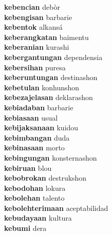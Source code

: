 \textbf{kebencian } debòr \\
\textbf{kebengisan } barbarie \\
\textbf{kebentok } alkansá \\
\textbf{keberangkatan } baimentu \\
\textbf{keberanian } kurashi \\
\textbf{kebergantungan } dependensia \\
\textbf{kebersihan } puresa \\
\textbf{keberuntungan } destinashon \\
\textbf{kebetulan } konhunshon \\
\textbf{kebezajelasan } deklarashon \\
\textbf{kebiadaban } barbarie \\
\textbf{kebiasaan } usual \\
\textbf{kebijaksanaan } kuidou \\
\textbf{kebimbangan } duda \\
\textbf{kebinasaan } morto \\
\textbf{kebingungan } konsternashon \\
\textbf{kebiruan } blou \\
\textbf{kebobrokan } destrukshon \\
\textbf{kebodohan } lokura \\
\textbf{kebolehan } talento \\
\textbf{kebolehterimaan } aceptabilidad \\
\textbf{kebudayaan } kultura \\
\textbf{kebumi } dera \\
